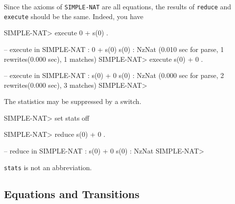 \documentclass[a4paper]{memoir}
\begin{document}
Since the axioms of \verb|SIMPLE-NAT| are all equations, the results of
\verb|reduce| and \verb|execute| should be the same. Indeed, you have
\begin{vvtm}
\begin{ccode}
  SIMPLE-NAT> execute 0 + s(0) .

  -- execute in SIMPLE-NAT : 0 + s(0)
  s(0) : NzNat
  (0.010 sec for parse, 1 rewrites(0.000 sec), 1 matches)
  SIMPLE-NAT> execute s(0) + 0 .

  -- execute in SIMPLE-NAT : s(0) + 0
  s(0) : NzNat
  (0.000 sec for parse, 2 rewrites(0.000 sec), 3 matches)
  SIMPLE-NAT> 
\end{ccode}
\end{vvtm}

The statistics may be suppressed by a switch.
\begin{vvtm}
\begin{ccode}
  SIMPLE-NAT> set stats off

  SIMPLE-NAT> reduce s(0) + 0 .

  -- reduce in SIMPLE-NAT : s(0) + 0
  s(0) : NzNat
  SIMPLE-NAT>
\end{ccode}
\end{vvtm}

\begin{warning}
  \verb|stats| is not an abbreviation.
\end{warning}

\subsection{Equations and Transitions}\label{sec:p2-eval-exs-2}
\end{document}
